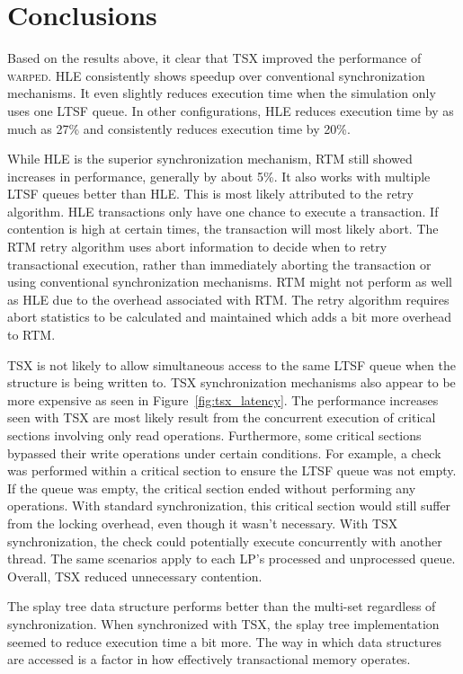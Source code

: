 \documentclass[11pt]{book}
\begin{document}
\section{Conclusions}

Based on the results above, it clear that TSX improved the performance of \textsc{warped}.
HLE consistently shows speedup over conventional synchronization mechanisms.  It even
slightly reduces execution time when the simulation only uses one LTSF queue.  In other
configurations, HLE reduces execution time by as much as 27\% and consistently
reduces execution time by 20\%.   

While HLE is the superior synchronization mechanism, RTM still showed increases
in performance, generally by about 5\%.  It also works with multiple
LTSF queues better than HLE.  This is most likely attributed to the retry
algorithm.  HLE transactions only have one chance to execute a transaction. If
contention is high at certain times, the transaction will most likely abort.
The RTM retry algorithm uses abort information to decide when to retry
transactional execution, rather than immediately aborting the transaction or
using conventional synchronization mechanisms.  RTM might not perform as well as
HLE due to the overhead associated with RTM.  The retry algorithm requires abort
statistics to be calculated and maintained which adds a bit more overhead to
RTM.  

TSX is not likely to allow simultaneous access to the same LTSF queue
when the structure is being written to.  TSX synchronization mechanisms also
appear to be more expensive as seen in Figure~\ref{fig:tsx_latency}.  The performance
increases seen with TSX are most likely result from the concurrent execution of 
critical sections involving only read operations.  Furthermore, some critical
sections bypassed their write operations under certain conditions.
For example, a check was performed within a critical section to ensure the LTSF
queue was not empty.  If the queue was empty, the critical section ended without performing
any operations.  With standard synchronization, this critical section would still
suffer from the locking overhead, even though it wasn't necessary.  With TSX
synchronization, the check could potentially execute concurrently with another
thread.  The same scenarios apply to each LP's processed and unprocessed queue.
Overall, TSX reduced unnecessary contention. 

The splay tree data structure performs better than the multi-set regardless of
synchronization.  When synchronized with TSX, the splay tree implementation
seemed to reduce execution time a bit more.  The way in which data structures
are accessed is a factor in how effectively transactional memory operates. 
\end{document}
